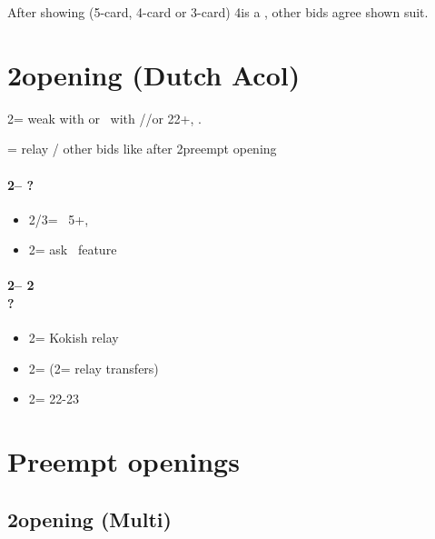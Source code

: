 \documentclass[12pt, a4paper]{report}
\begin{document}
{{{            \vspace{0.5cm}

            After showing \minor (5-card, 4-card or 3-card) 4\nt is a \soff, other bids
            agree shown suit.
        }

    }

    \chapter*{\colorbox{Plum!30}{2\clubs opening (Dutch Acol)}}
     {

        2\clubs = weak with \diams or \gf\ with \clubs/\hearts/\spades or 22+, \bal.
        
        \diams = relay / other bids like after 2\diams preempt opening

        \subsubsection*{2\clubs -- ?}
        \begin{itemize}
            \item 2\major/3\minor = \nat\ 5+, \fonce
            \item 2\nt = ask \nt\ feature
        \end{itemize}

        \subsubsection*{2\clubs -- 2\diams\\
                        ?}
        \begin{itemize}
            \item 2\hearts = Kokish relay
            \item 2\spades = \nat (2\nt = relay \then transfers)
            \item 2\nt = 22-23 \bal\ \nf
        \end{itemize}
    }

    \chapter*{\colorbox{Plum!30}{Preempt openings}}
     {

        \section*{\colorbox{blue!30}{2\diams opening (Multi)}}
         {

}}}
\end{document}
